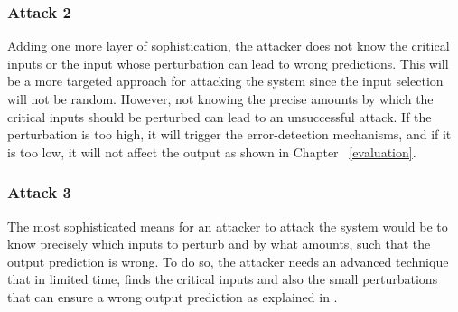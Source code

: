 \subsubsection{Attack 2}
Adding one more layer of sophistication, the attacker does not
know the critical inputs or the input whose perturbation can lead to wrong predictions.
 This will be a more targeted approach for attacking the system since the input selection will not be random. 
However, not knowing the precise amounts by which the critical inputs should be perturbed can lead to an unsuccessful attack. 
If the perturbation is too high, it will trigger the error-detection mechanisms, 
and if it is too low, it will not affect the output as shown in Chapter ~\ref{evaluation}. 

\subsubsection{Attack 3}
The most sophisticated means for an attacker to attack the system would be to know precisely which inputs to perturb and by what amounts,
 such that the output prediction is wrong. 
To do so, the attacker needs an advanced technique that in limited time, finds the critical inputs
 and also the small perturbations that can ensure a wrong output prediction as explained in . 

















